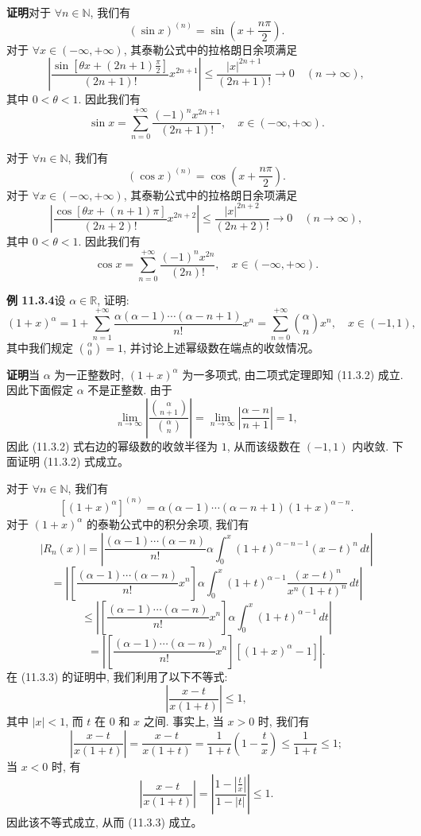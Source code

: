 \documentclass[UTF8, 12pt, fontset=fandol, oneside]{ctexart}
\begin{document}
\noindent\textbf{证明}\quad 对于 $\forall n\in\mathbb N$, 我们有
\[
  (\sin x)^{(n)}=\sin\left(x+\frac{n\pi}{2}\right).
\]
对于 $\forall x\in(-\infty,+\infty)$, 其泰勒公式中的拉格朗日余项满足
\[
  \left|
    \frac{\sin\left[\theta x+(2n+1)\frac{\pi}{2}\right]}{(2n+1)!}
    x^{2n+1}
  \right|
  \leqslant
  \frac{|x|^{2n+1}}{(2n+1)!}
  \to0\quad(n\to\infty),
\]
其中 $0<\theta<1$. 因此我们有
\[
  \sin x=\sum_{n=0}^{+\infty}\frac{(-1)^nx^{2n+1}}{(2n+1)!},
  \quad x\in(-\infty,+\infty).
\]

对于 $\forall n\in\mathbb N$, 我们有
\[
  (\cos x)^{(n)}=\cos\left(x+\frac{n\pi}{2}\right).
\]
对于 $\forall x\in(-\infty,+\infty)$, 其泰勒公式中的拉格朗日余项满足
\[
  \left|
    \frac{\cos[\theta x+(n+1)\pi]}{(2n+2)!}
    x^{2n+2}
  \right|
  \leqslant
  \frac{|x|^{2n+2}}{(2n+2)!}
  \to0\quad(n\to\infty),
\]
其中 $0<\theta<1$. 因此我们有
\[
  \cos x=\sum_{n=0}^{+\infty}\frac{(-1)^nx^{2n}}{(2n)!},
  \quad x\in(-\infty,+\infty).
\]

\noindent\textbf{例 11.3.4}\quad 设 $\alpha\in\mathbb R$, 证明:
\begin{equation}
  (1+x)^\alpha
  =
  1+\sum_{n=1}^{+\infty}
  \frac{\alpha(\alpha-1)\cdots(\alpha-n+1)}{n!}x^n
  =
  \sum_{n=0}^{+\infty}\binom{\alpha}{n}x^n,
  \quad x\in(-1,1),
  \tag{11.3.2}
\end{equation}
其中我们规定 $\binom{\alpha}{0}=1$, 并讨论上述幂级数在端点的收敛情况。

\noindent\textbf{证明}\quad 当 $\alpha$ 为一正整数时, $(1+x)^\alpha$ 为一多项式, 由二项式定理即知 (11.3.2) 成立. 因此下面假定 $\alpha$ 不是正整数. 由于
\[
  \lim_{n\to\infty}
  \left|
    \frac{\binom{\alpha}{n+1}}{\binom{\alpha}{n}}
  \right|
  =
  \lim_{n\to\infty}\left|\frac{\alpha-n}{n+1}\right|
  =1,
\]
因此 (11.3.2) 式右边的幂级数的收敛半径为 $1$, 从而该级数在 $(-1,1)$ 内收敛. 下面证明 (11.3.2) 式成立。

对于 $\forall n\in\mathbb N$, 我们有
\[
  [(1+x)^\alpha]^{(n)}
  =
  \alpha(\alpha-1)\cdots(\alpha-n+1)(1+x)^{\alpha-n}.
\]
对于 $(1+x)^\alpha$ 的泰勒公式中的积分余项, 我们有
\[
  |R_n(x)|
  =
  \left|
    \frac{(\alpha-1)\cdots(\alpha-n)}{n!}\alpha
    \int_0^x(1+t)^{\alpha-n-1}(x-t)^n\,dt
  \right|
\]
\[
  =
  \left|
    \left[\frac{(\alpha-1)\cdots(\alpha-n)}{n!}x^n\right]
    \alpha\int_0^x(1+t)^{\alpha-1}
    \frac{(x-t)^n}{x^n(1+t)^n}\,dt
  \right|
\]
\[
  \leqslant
  \left|
    \left[\frac{(\alpha-1)\cdots(\alpha-n)}{n!}x^n\right]
    \alpha\int_0^x(1+t)^{\alpha-1}\,dt
  \right|
\]
\[
  =
  \left|
    \left[\frac{(\alpha-1)\cdots(\alpha-n)}{n!}x^n\right]
    [(1+x)^\alpha-1]
  \right|.
  \tag{11.3.3}
\]
在 (11.3.3) 的证明中, 我们利用了以下不等式:
\[
  \left|\frac{x-t}{x(1+t)}\right|\leqslant1,
\]
其中 $|x|<1$, 而 $t$ 在 $0$ 和 $x$ 之间. 事实上, 当 $x>0$ 时, 我们有
\[
  \left|\frac{x-t}{x(1+t)}\right|
  =
  \frac{x-t}{x(1+t)}
  =
  \frac1{1+t}\left(1-\frac{t}{x}\right)
  \leqslant
  \frac1{1+t}
  \leqslant1;
\]
当 $x<0$ 时, 有
\[
  \left|\frac{x-t}{x(1+t)}\right|
  =
  \left|\frac{1-\left|\frac{t}{x}\right|}{1-|t|}\right|
  \leqslant1.
\]
因此该不等式成立, 从而 (11.3.3) 成立。
\end{document}
